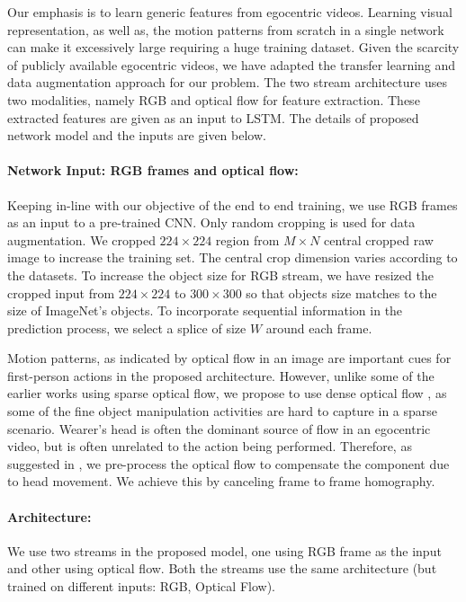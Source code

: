 \documentclass{article}
\begin{document}
Our emphasis is to learn generic features from egocentric videos. Learning visual representation, as well as, the motion patterns from scratch in a single network can make it excessively large requiring a huge training dataset. Given the scarcity of publicly available egocentric videos, we have adapted the transfer learning and data augmentation approach for our problem. The two stream architecture uses two modalities, namely RGB and optical flow for feature extraction. These extracted features are given as an input to LSTM. The details of proposed network model and the inputs are given below.

\paragraph*{Network Input: RGB frames and optical flow:}

Keeping in-line with our objective of the end to end training, we use RGB frames as an input to a pre-trained CNN. Only random cropping is used for data augmentation. We cropped $224 \times 224$ region from $M \times N$ central cropped raw image to increase the training set. The central crop dimension varies according to the datasets. To increase the object size for RGB stream, we have resized the cropped input from $224 \times 224$ to $300 \times 300$ so that objects size matches to the size of ImageNet's objects. To incorporate sequential information in the prediction process, we select a splice of size $W$ around each frame.

Motion patterns, as indicated by optical flow in an image are important cues for first-person actions in the proposed architecture. However, unlike some of the earlier works \cite{poleg2014temporal, poleg2016compact} using sparse optical flow, we propose to use dense optical flow \cite{liu2009beyond}, as some of the fine object manipulation activities are hard to capture in a sparse scenario. Wearer's head is often the dominant source of flow in an egocentric video, but is often unrelated to the action being performed. Therefore, as suggested in \cite{suriya2016trajfeatures, suriya2016cvpr}, we pre-process the optical flow to compensate the component due to head movement. We achieve this by canceling frame to frame homography.    

\paragraph*{Architecture:}

We use two streams in the proposed model, one using RGB frame as the input and other using optical flow. Both the streams use the same architecture (but trained on different inputs: RGB, Optical Flow).
\end{document}
